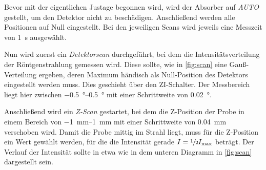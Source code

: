 Bevor mit der eigentlichen Justage begonnen wird,
wird der Absorber auf \emph{AUTO} gestellt,
um den Detektor nicht zu beschädigen.
Anschließend werden alle Positionen auf Null eingestellt.
Bei den jeweiligen Scans wird jeweils eine Messzeit von \SI{1}{\second} ausgewählt.

Nun wird zuerst ein \emph{Detektorscan} durchgeführt,
bei dem die Intensitätsverteilung der Röntgenstrahlung gemessen wird.
Diese sollte,
wie in \autoref{fig:scan} eine Gauß-Verteilung ergeben,
deren Maximum händisch als Null-Position des Detektors eingestellt werden muss.
Dies geschieht über den ZI-Schalter.
Der Messbereich liegt hier zwischen \SIrange{-0.5}{0.5}{\degree} mit einer Schrittweite von \SI{0.02}{\degree}.

Anschließend wird ein \emph{Z-Scan} gestartet,
bei dem die Z-Position der Probe in einem Bereich von \SIrange{-1}{1}{\milli\meter} mit einer Schrittweite von \SI{0.04}{\milli\meter} verschoben wird.
Damit die Probe mittig im Strahl liegt,
muss für die Z-Position ein Wert gewählt werden,
für die die Intensität gerade $I = \sfrac{1}{2} I_\text{max}$ beträgt.
Der Verlauf der Intensität sollte in etwa wie in dem unteren Diagramm in \autoref{fig:scan} dargestellt sein.
